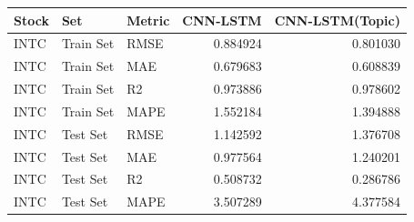 \begin{tabular}{lllrr}
\toprule
Stock & Set & Metric & CNN-LSTM & CNN-LSTM(Topic) \\
\midrule
INTC & Train Set & RMSE & 0.884924 & 0.801030 \\
INTC & Train Set & MAE & 0.679683 & 0.608839 \\
INTC & Train Set & R2 & 0.973886 & 0.978602 \\
INTC & Train Set & MAPE & 1.552184 & 1.394888 \\
INTC & Test Set & RMSE & 1.142592 & 1.376708 \\
INTC & Test Set & MAE & 0.977564 & 1.240201 \\
INTC & Test Set & R2 & 0.508732 & 0.286786 \\
INTC & Test Set & MAPE & 3.507289 & 4.377584 \\
\bottomrule
\end{tabular}
